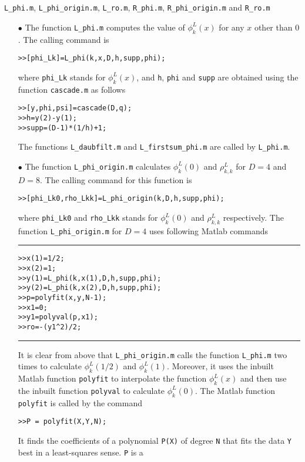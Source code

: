 \documentclass[acmtoms]{acmtrans2m}
\begin{document}
\section{} \verb#L_phi.m#, \verb#L_phi_origin.m#, \verb#L_ro.m#, \verb#R_phi.m#, \verb#R_phi_origin.m# and  \verb#R_ro.m# 
\begin{itemize}
\item[$\bullet$]
The function
\verb#L_phi.m# computes the value of $\phi_k^L(x)$ for any
$x$ other than $0$. The calling command is
\begin{alltt}
>>[phi_Lk]=L_phi(k,x,D,h,supp,phi);
\end{alltt}
where \verb#phi_Lk# stands for $\phi^{L}_{k}(x)$, and \verb#h#, \verb#phi# and \verb#supp# are obtained  using the function \verb#cascade.m# as follows
\begin{verbatim}
>>[y,phi,psi]=cascade(D,q);
>>h=y(2)-y(1);
>>supp=(D-1)*(1/h)+1;
\end{verbatim}
The functions \verb#L_daubfilt.m# and \verb#L_firstsum_phi.m# are called by \verb#L_phi.m#.
\item[$\bullet$]
The function \verb#L_phi_origin.m# calculates $\phi_k^L(0)$ and $\rho_{k,k}^L$ for $D=4$ and $D=8$. The calling command for this function is
\begin{alltt}
>>[phi_Lk0, rho_Lkk]=L_phi_origin(k,D,h,supp,phi);
\end{alltt}
where \verb#phi_Lk0# and \verb#rho_Lkk# stands for $\phi_{k}^{L}(0)$ and $\rho_{k,k}^{L}$ respectively.
The function \verb#L_phi_origin.m# for $D=4$ uses following Matlab commands
\\\hrule
\begin{verbatim}
>>x(1)=1/2;
>>x(2)=1;
>>y(1)=L_phi(k,x(1),D,h,supp,phi);
>>y(2)=L_phi(k,x(2),D,h,supp,phi);
>>p=polyfit(x,y,N-1);
>>x1=0;
>>y1=polyval(p,x1);
>>ro=-(y1^2)/2;
\end{verbatim}
\hrule\vspace{.5cm}
It is clear from above that \verb#L_phi_origin.m# calls the function \verb#L_phi.m# two times to calculate
$\phi_k^L(1/2)$ and $\phi_k^L(1)$. Moreover, it uses the inbuilt Matlab function \verb#polyfit# to interpolate the function
$\phi_k^L(x)$ and then use the inbuilt function \verb#polyval# to calculate $\phi_k^L(0)$. The Matlab function \verb#polyfit# is called by the command
\begin{verbatim}
>>P = polyfit(X,Y,N);
\end{verbatim}
It finds the coefficients of a polynomial \verb#P(X)# of
degree \verb#N# that fits the data \verb#Y# best in a least-squares sense. \verb#P# is a

\end{itemize}
\end{document}
